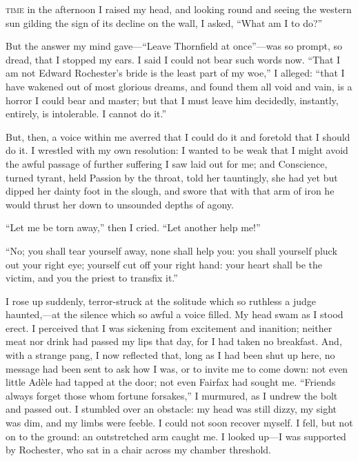 
 \textsc{time} in the afternoon I raised my head, and looking round and
seeing the western sun gilding the sign of its decline on the wall, I
asked, \enquote{What am I to do?}

\zz
But the answer my mind gave---\enquote{Leave Thornfield at once}---was
so prompt, so dread, that I stopped my ears. I said I could not bear
such words now. \enquote{That I am not Edward Rochester's bride is the
	least part of my woe,} I alleged: \enquote{that I have wakened out of
	most glorious dreams, and found them all void and vain, is a horror I
	could bear and master; but that I must leave him decidedly, instantly,
	entirely, is intolerable. I cannot do it.}

But, then, a voice within me averred that I could do it and foretold
that I should do it. I wrestled with my own resolution: I wanted to be
weak that I might avoid the awful passage of further suffering I saw
laid out for me; and Conscience, turned tyrant, held Passion by the
throat, told her tauntingly, she had yet but dipped her dainty foot in
the slough, and swore that with that arm of iron he would thrust her
down to unsounded depths of agony.

\enquote{Let me be torn away,} then I cried. \enquote{Let another help
	me!}

\enquote{No; you shall tear yourself away, none shall help you: you
	shall yourself pluck out your right eye; yourself cut off your right
	hand: your heart shall be the victim, and you the priest to transfix
	it.}

I rose up suddenly, terror-struck at the solitude which so ruthless a
judge haunted,---at the silence which so awful a voice filled. My head
swam as I stood erect. I perceived that I was sickening from excitement
and inanition; neither meat nor drink had passed my lips that day, for I
had taken no breakfast. And, with a strange pang, I now reflected that,
long as I had been shut up here, no message had been sent to ask how I
was, or to invite me to come down: not even little Adèle had tapped at
the door; not even \Mrs{} Fairfax had sought me. \enquote{Friends always
	forget those whom fortune forsakes,} I murmured, as I undrew the bolt
and passed out. I stumbled over an obstacle: my head was still dizzy,
my sight was dim, and my limbs were feeble. I could not soon recover
myself. I fell, but not on to the ground: an outstretched arm caught
me. I looked up---I was supported by \Mr{} Rochester, who sat in a chair
across my chamber threshold.

